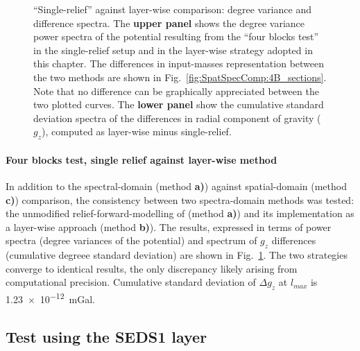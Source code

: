 \begin{subappendices}
\begin{figure} %
    \begin{adjustbox}{center}
    \end{adjustbox}
    \caption[``Single-relief'' against layer-wise comparison: degree variance and difference spectra.]{
        ``Single-relief'' against layer-wise comparison: degree variance and difference spectra.
        The \textbf{upper panel} shows the degree variance power spectra of the potential resulting from the ``four blocks test'' in the single-relief setup \parencite[unmodified method of][]{Wieczorek2007} and in the layer-wise strategy adopted in this chapter.
        The differences in input-masses representation between the two methods are shown in Fig.~\ref{fig:SpatSpecComp:4B_sections}.
        Note that no difference can be graphically appreciated between the two plotted curves.
        The \textbf{lower panel} show the cumulative standard deviation spectra of the differences in radial component of gravity ($g_z$), computed as layer-wise minus single-relief.}
    \label{fig:SpatSpecComp:4B_dv_spec_relief}
\end{figure}

\paragraph*{Four blocks test, single relief against layer-wise method}
In addition to the spectral-domain (method \textbf{a)}) against spatial-domain (method \textbf{c)}) comparison, the consistency between two spectra-domain methods was tested: the unmodified relief-forward-modelling of \textcite{Wieczorek2007} (method \textbf{a)}) and its implementation as a layer-wise approach (method \textbf{b)}).
The results, expressed in terms of power spectra (degree variances of the potential) and spectrum of $g_z$ differences (cumulative degreee standard deviation) are shown in Fig.~\ref{fig:SpatSpecComp:4B_dv_spec_relief}.
The two strategies converge to identical results, the only discrepancy likely arising from computational precision.
Cumulative standard deviation of $\Delta g_z$ at $l_{max}$ is \SI{1.23e-12}{\milli Gal}.

\FloatBarrier

\subsection{Test using the SEDS1 layer}
\label{ss:SigIs:Test:SEDS1}


\end{subappendices}
